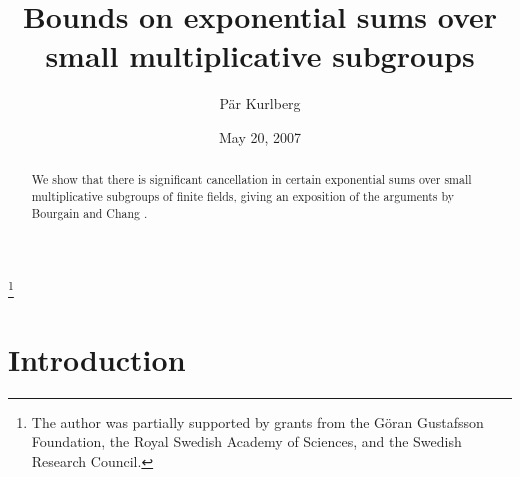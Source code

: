 \documentclass[11pt]{amsart}
\newcommand{\timestamp}{Time-stamp: "2007-05-20 23:18:20 kurlberg"}
\begin{document}
\title[Exponential sums over small multiplicative subgroups]{Bounds on  exponential sums over small multiplicative
  subgroups}
\author{P\"ar Kurlberg}

\address{Department of Mathematics, Royal Institute of Technology,
SE-100 44 Stockholm, Sweden}

\date{May 20, 2007}
\thanks{The author was partially supported by grants from the G\"oran
Gustafsson Foundation, the Royal Swedish Academy of Sciences, and the
Swedish Research Council.}

\begin{abstract}
We show that there is significant cancellation in certain
exponential sums over small multiplicative subgroups of finite
fields, giving an exposition of the arguments by Bourgain and Chang
\cite{boch06}.
\end{abstract}
\maketitle


\section{Introduction}
\end{document}

